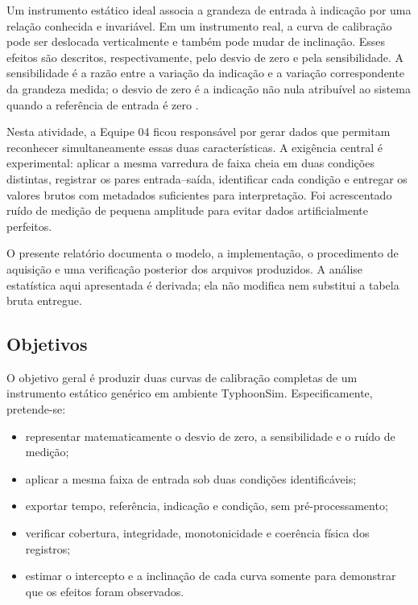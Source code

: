 \documentclass[12pt,a4paper]{article}
\begin{document}
Um instrumento estático ideal associa a grandeza de entrada à indicação por uma relação conhecida e invariável. Em um instrumento real, a curva de calibração pode ser deslocada verticalmente e também pode mudar de inclinação. Esses efeitos são descritos, respectivamente, pelo desvio de zero e pela sensibilidade. A sensibilidade é a razão entre a variação da indicação e a variação correspondente da grandeza medida; o desvio de zero é a indicação não nula atribuível ao sistema quando a referência de entrada é zero \cite{vim2012}.

Nesta atividade, a Equipe 04 ficou responsável por gerar dados que permitam reconhecer simultaneamente essas duas características. A exigência central é experimental: aplicar a mesma varredura de faixa cheia em duas condições distintas, registrar os pares entrada--saída, identificar cada condição e entregar os valores brutos com metadados suficientes para interpretação. Foi acrescentado ruído de medição de pequena amplitude para evitar dados artificialmente perfeitos.

O presente relatório documenta o modelo, a implementação, o procedimento de aquisição e uma verificação posterior dos arquivos produzidos. A análise estatística aqui apresentada é derivada; ela não modifica nem substitui a tabela bruta entregue.

\subsection{Objetivos}

O objetivo geral é produzir duas curvas de calibração completas de um instrumento estático genérico em ambiente TyphoonSim. Especificamente, pretende-se:

\begin{itemize}
  \item representar matematicamente o desvio de zero, a sensibilidade e o ruído de medição;
  \item aplicar a mesma faixa de entrada sob duas condições identificáveis;
  \item exportar tempo, referência, indicação e condição, sem pré-processamento;
  \item verificar cobertura, integridade, monotonicidade e coerência física dos registros;
  \item estimar o intercepto e a inclinação de cada curva somente para demonstrar que os efeitos foram observados.
\end{itemize}
\end{document}
